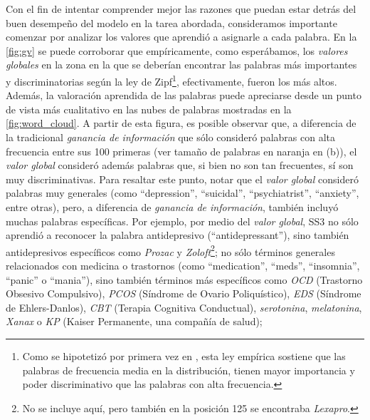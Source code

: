 Con el fin de intentar comprender mejor las razones que puedan estar detrás del buen desempeño del modelo en la tarea abordada, consideramos importante comenzar por analizar los valores que aprendió a asignarle a cada palabra.
En la \autoref{fig:gv} se puede corroborar que empíricamente, como esperábamos, los \emph{valores globales} en la zona en la que se deberían encontrar las palabras más importantes y discriminatorias según la ley de Zipf\footnote{Como se hipotetizó por primera vez en \cite{luhn1958automatic}, esta ley empírica sostiene que las palabras de frecuencia media en la distribución, tienen mayor importancia y poder discriminativo que las palabras con alta frecuencia.}, efectivamente, fueron los más altos. 
Además, la valoración aprendida de las palabras puede apreciarse desde un punto de vista más cualitativo en las nubes de palabras mostradas en la  \autoref{fig:word_cloud}. %
A partir de esta figura, es posible observar que, a diferencia de la tradicional \emph{ganancia de información} que sólo consideró palabras con alta frecuencia entre sus 100 primeras (ver tamaño de palabras en naranja en (b)), el \emph{valor global} consideró además palabras que, si bien no son tan frecuentes, sí son muy discriminativas.
Para resaltar este punto, notar que el \emph{valor global} consideró palabras muy generales (como ``depression'', ``suicidal'', ``psychiatrist'', ``anxiety'', entre otras), pero, a diferencia de \emph{ganancia de información}, también incluyó muchas palabras específicas.
Por ejemplo, por medio del \emph{valor global}, SS3 no sólo aprendió a reconocer la palabra antidepresivo (``antidepressant''), sino también antidepresivos específicos como \emph{Prozac} y \emph{Zoloft}\footnote{No se incluye aquí, pero también en la posición 125 se encontraba \emph{Lexapro}.};
no sólo términos generales relacionados con medicina o trastornos (como ``medication'', ``meds'', ``insomnia'', ``panic'' o ``mania''), sino también términos más específicos como \emph{OCD} (Trastorno Obsesivo Compulsivo), \emph{PCOS} (Síndrome de Ovario Poliquístico), \emph {EDS} (Síndrome de Ehlers-Danlos), \emph{CBT} (Terapia Cognitiva Conductual), \emph{serotonina}, \emph{melatonina}, \emph{Xanax} o \emph{KP} (Kaiser Permanente, una compañía de salud);
